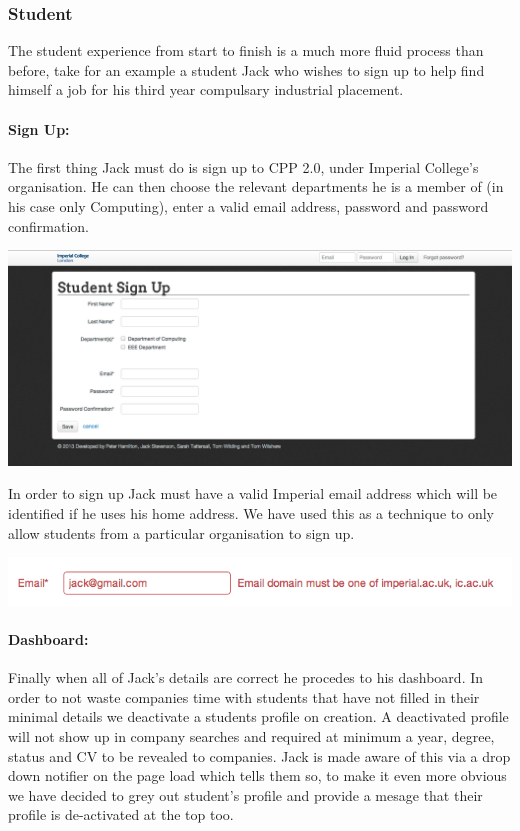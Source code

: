 \subsubsection{Student}
The student experience from start to finish is a much more fluid process than before, take for an example a student Jack who wishes to sign up to help find himself a job for his third year compulsary industrial placement.
  \paragraph{Sign Up:}
    The first thing Jack must do is sign up to CPP 2.0, under Imperial College's organisation. He can then choose the relevant departments he is a member of (in his case only Computing), enter a valid email address, password and password confirmation.

    \begin{center}
    \includegraphics[scale=0.3]{images/user_experiences/student/sign_up_page}
    \end{center}

    In order to sign up Jack must have a valid Imperial email address which will be identified if he uses his home address. We have used this as a technique to only allow students from a particular organisation to sign up.

    \begin{center}
    \includegraphics[scale=0.5]{images/user_experiences/student/invalid_email}
    \end{center}

  \paragraph{Dashboard:}
    Finally when all of Jack's details are correct he procedes to his dashboard. In order to not waste companies time with students that have not filled in their minimal details we deactivate a students profile on creation. A deactivated profile will not show up in company searches and required at minimum a year, degree, status and CV to be revealed to companies. 
    Jack is made aware of this via a drop down notifier on the page load which tells them so, to make it even more obvious we have decided to grey out student's profile and provide a mesage that their profile is de-activated at the top too.

